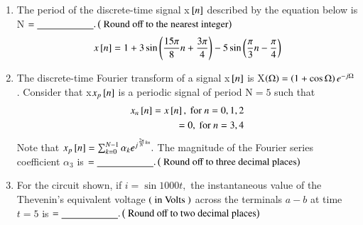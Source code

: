 \documentclass[journal]{IEEEtran}
\begin{document}
\begin{enumerate} [start=40]
$\brak{\text{ neglecting the stator leakage impedance and rotational losses}}$ is
$\underline{\hspace{2cm}}.\brak{\text{ Round off to the nearest integer}}$
\bigskip
\item The period of the discrete-time signal x${}\left[n\right]$ described by the equation below is N $=\underline{\hspace{2cm}}.\left(\text{ Round off to the nearest integer}\right)$
\begin{align*}
    x{}\left[n\right]=1+3\sin\left(\frac{15\pi}{8}n+\frac{3\pi}{4}\right)-5\sin\left(\frac{\pi}{3}n-\frac{\pi}{4}\right)
\end{align*}
\bigskip
\item The discrete-time Fourier transform of a signal x${}\left[n\right]$ is X$\left(\ohm\right)=\left(1+\cos\ohm\right)e^{-j\ohm}$. Consider that x$x_{p}{}\left[n\right]$ is a periodic signal of period N$=5$ such that 
\begin{align*}
    x_{n}{}\left[n\right]=x{}\left[n\right],\text{ for } n=0,1,2\\
    =0,\text{ for } n=3,4
\end{align*}
Note that $x_{p}{}\left[n\right]=\sum_{k=0}^{N-1}\alpha_{k}e^{j^{\frac{2\pi}{N}kn}}.$ The magnitude of the Fourier series coefficient $\alpha_{3}$ is $=\underline{\hspace{2cm}}.\left(\text{ Round off to three decimal places}\right)$
\bigskip
\item For the circuit shown, if $i=\sin1000t,$ the instantaneous value of the Thevenin's equivalent voltage $\left(\text{ in Volts }\right)$ across the terminals $a-b$ at time $t=5$ is $=\underline{\hspace{2cm}}.\left(\text{ Round off to two decimal places}\right)$
\begin{figure}[!ht]
\centering
{}
\end{figure}
\end{enumerate}
\end{document}
